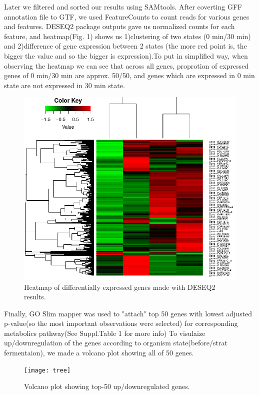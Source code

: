\documentclass{article}
\begin{document}
 Later we filtered and sorted our results using SAMtools. After coverting GFF annotation file to GTF, we used FeatureCounts to count reads for various genes and features. DESEQ2 package outputs gave us normalized counts for each feature, and heatmap(Fig. 1) shows us 1)clustering of two states (0 min/30 min) and 2)difference of gene expression between 2 states (the more red point is, the bigger the value and so the bigger is expression).To put in simplified way, when observing the heatmap we can see that across all genes, proprotion of expressed genes of 0 min/30 min are approx. 50/50, and genes which are expressed in 0 min state are not expressed in 30 min state. 
 
 
  \begin{figure}[h]
 	\centering
 	\includegraphics[scale=1.77]{heatmap}  
 	\caption{ Heatmap of differentially expressed genes made with DESEQ2 results.}
 	\label{heatmap}
 \end{figure}
 
 
 Finally, GO Slim mapper was used to "attach" top 50 genes with lowest adjusted p-value(so the most important observations were selected) for corresponding metabolics pathway(See Suppl.Table 1 for more info)
 To visulaize up/downregulation of the genes according to organism state(before/strat fermentaion), we made a volcano plot showing all of 50 genes.
 
 \begin{figure}[h]
	\centering
	\texttt{[image: tree]}  
	\caption{ Volcano plot showing top-50 up/downregulated genes.}
	\label{tree}
\end{figure}
 
\end{document}
